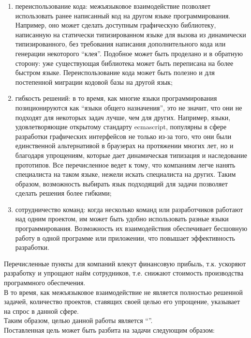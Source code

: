\documentclass[times,specification,annotation]{itmo-student-thesis}
\begin{document}
\begin{enumerate}
\item переиспользование кода: межъязыковое взаимодействие позволяет использовать ранее написанный код на другом языке программирования. Например, оно может сделать доступным графическую библиотеку, написанную на статически типизированном языке для вызова из динамически типизированного, без требования написания дополнительного кода или генерации некоторого ``клея''. Подобное может быть проделано и в обратную сторону: уже существующая библиотека может быть переписана на более быстром языке. Переиспользование кода может быть полезно и для постепенной миграции кодовой базы на другой язык;

\item гибкость решений: в то время, как многие языки программирования позиционируются как ``языки общего назначения'', это не значит, что они не подходят для некоторых задач лучше, чем для других. Например, языки, удовлетворяющие открытому стандарту ecmascript, популярны в сфере разработки графических интерфейсов не только из-за того, что они были единственной альтернативой в браузерах на протяжении многих лет, но и благодаря упрощениям, которые дает динамическая типизация и наследование прототипов. Все перечисленное ведет к тому, что компаниям легче нанять специалиста на таком языке, нежели искать специалиста на других. Таким образом, возможность выбирать язык подходящий для задачи позволяет сделать решения более гибкими;

\item сотрудничество команд: когда несколько команд или разработчиков работают над одним проектом, им может быть удобно использовать разные языки программирования. Возможность их взаимодействия обеспечивает бесшовную работу в одной программе или приложении, что повышает эффективность разработки.
\end{enumerate}

Перечисленные пункты для компаний влекут финансовую прибыль, т.к. ускоряют разработку и упрощают найм сотрудников, т.е. снижают стоимость производства программного обеспечения.\\
В то время, как межъязыковое взаимодействие не является полностью решенной задачей, количество проектов, ставящих своей целью его упрощение, указывает на спрос в данной сфере.\\

Таким образом, целью данной работы является ``\MyResearchAim''.\\
Поставленная цель может быть разбита на задачи следующим образом:
\begin{enumerate}
	\MyResearchTargets
\end{enumerate}
\end{document}
